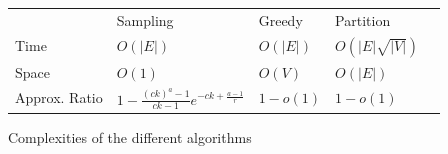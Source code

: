 \begin{figure}[H]
\centering
\begin{tabular}{l|l|l|l|l}
\cline{2-4}
                                    & Sampling                                        & Greedy   & Partition          &  \\ \cline{1-4}
\multicolumn{1}{|l|}{Time}          & $O(|E|)$                                        & $O(|E|)$ & $O(|E|\sqrt{|V|})$ &  \\ \cline{1-4}
\multicolumn{1}{|l|}{Space}         & $O(1)$                                          & $O(V)$   & $O(|E|)$           &  \\ \cline{1-4}
\multicolumn{1}{|l|}{Approx. Ratio} & $1-\frac{(ck)^a-1}{ck-1}e^{-ck+\frac{a-1}{r}}$  & $1-o(1)$ & $1-o(1)$           &  \\ \cline{1-4}
\end{tabular}
\caption{Complexities of the different algorithms}
\end{figure}